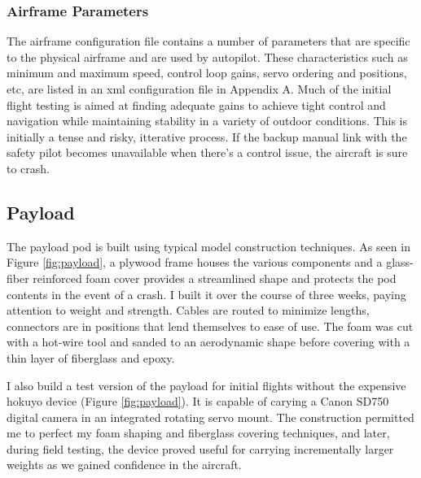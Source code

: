 \documentclass[a4paper,11pt]{report}
\begin{document}
\subsubsection{Airframe Parameters}

The airframe configuration file contains a number of parameters that are specific to the physical airframe and are used by autopilot. These characteristics such as minimum and maximum speed, control loop gains, servo ordering and positions, etc, are listed in an xml configuration file in Appendix A. Much of the initial flight testing is aimed at finding adequate gains to achieve tight control and navigation while maintaining stability in a variety of outdoor conditions. This is initially a tense and risky, itterative process. If the backup manual link with the safety pilot becomes unavailable when there's a control issue, the aircraft is sure to crash.

\subsection{Payload}

The payload pod is built using typical model construction techniques. As seen in Figure \ref{fig:payload}, a plywood frame houses the various components and a glass-fiber reinforced foam cover provides a streamlined shape and protects the pod contents in the event of a crash. I built it over the course of three weeks, paying attention to weight and strength. Cables are routed to minimize lengths, connectors are in positions that lend themselves to ease of use. The foam was cut with a hot-wire tool and sanded to an aerodynamic shape before covering with a thin layer of fiberglass and epoxy. 

I also build a test version of the payload for initial flights without the expensive hokuyo device (Figure \ref{fig:payload}). It is capable of carying a Canon SD750 digital camera in an integrated rotating servo mount. The construction permitted me to perfect my foam shaping and fiberglass covering techniques, and later, during field testing, the device proved useful for carrying incrementally larger weights as we gained confidence in the aircraft.
\end{document}
